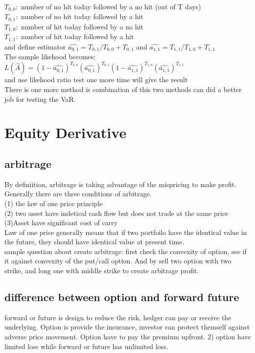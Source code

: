 \documentclass[a4paper,11pt]{article}
\begin{document}
$T_{0,0}:$ number of no hit today followed by a no hit (out of T days)\\
$T_{0,1}:$ number of no hit today followed by a hit\\
$T_{1,0}:$ number of hit today followed by a no hit\\
$T_{1,1}:$ number of hit today followed by a hit\\
and define estimator $\hat{a_{0,1}}=T_{0,1}/T_{0,0}+T_{0,1}$ and $\hat{a_{1,1}}=T_{1,1}/T_{1,0}+T_{1,1}$\\
The sample likehood becomes:$L(\hat{A})=(1-\hat{a_{0,1}})^{T_{0,0}}(\hat{a_{0,1}})^{T_{0,1}}(1-\hat{a_{1,1}})^{T_{1,0}}(\hat{a_{1,1}})^{T_{1,1}}$\\
and use likehood ratio test one more time will give the result\\
There is one more method is combination of this two methods can did a better job for testing the VaR.
\section{Equity Derivative}
\subsection{arbitrage}
By definiition, arbitrage is taking advantage of the mispricing to make profit. Generally there are three conditions of arbitrage.\\
(1) the law of one price principle\\
(2) two asset have indetical cash flow but does not trade at the same price\\
(3)Asset have significant cost of carry\\
Law of one price generally means that if two portfoilo have the identical value in the future, they should have identical value at present time.\\
sample question about create arbitrage: first check the convexity of option, see if it against convexity of the put/call option. And by sell two option with two strike, and long one with middle strike to create arbitrage profit. \\
\subsection{difference between option and forward future}
forward or future is design to reduce the risk, hedger can pay or receive the underlying. Option is provide the insurance, investor can protect themself against adverse price movement. Option have to pay the premium upfront. 2) option have limited loss while forward or future has unlimited loss.
\end{document}
